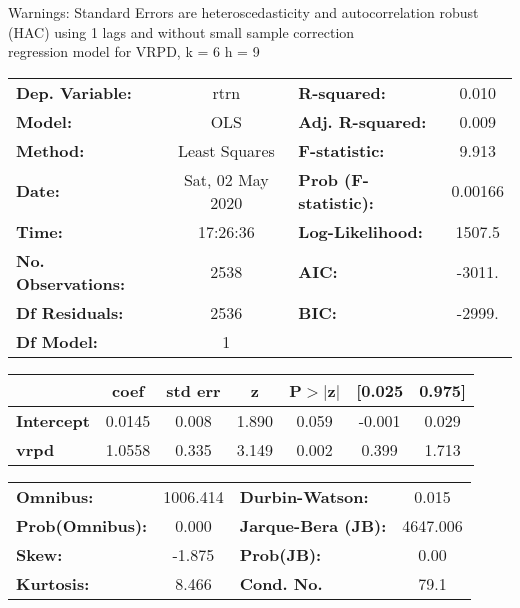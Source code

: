 Warnings: \newline
 [1] Standard Errors are heteroscedasticity and autocorrelation robust (HAC) using 1 lags and without small sample correction\\ 

regression model for VRPD, k = 6 h = 9\begin{center}
\begin{tabular}{lclc}
\toprule
\textbf{Dep. Variable:}    &       rtrn       & \textbf{  R-squared:         } &     0.010   \\
\textbf{Model:}            &       OLS        & \textbf{  Adj. R-squared:    } &     0.009   \\
\textbf{Method:}           &  Least Squares   & \textbf{  F-statistic:       } &     9.913   \\
\textbf{Date:}             & Sat, 02 May 2020 & \textbf{  Prob (F-statistic):} &  0.00166    \\
\textbf{Time:}             &     17:26:36     & \textbf{  Log-Likelihood:    } &    1507.5   \\
\textbf{No. Observations:} &        2538      & \textbf{  AIC:               } &    -3011.   \\
\textbf{Df Residuals:}     &        2536      & \textbf{  BIC:               } &    -2999.   \\
\textbf{Df Model:}         &           1      & \textbf{                     } &             \\
\bottomrule
\end{tabular}
\begin{tabular}{lcccccc}
                   & \textbf{coef} & \textbf{std err} & \textbf{z} & \textbf{P$> |$z$|$} & \textbf{[0.025} & \textbf{0.975]}  \\
\midrule
\textbf{Intercept} &       0.0145  &        0.008     &     1.890  &         0.059        &       -0.001    &        0.029     \\
\textbf{vrpd}      &       1.0558  &        0.335     &     3.149  &         0.002        &        0.399    &        1.713     \\
\bottomrule
\end{tabular}
\begin{tabular}{lclc}
\textbf{Omnibus:}       & 1006.414 & \textbf{  Durbin-Watson:     } &    0.015  \\
\textbf{Prob(Omnibus):} &   0.000  & \textbf{  Jarque-Bera (JB):  } & 4647.006  \\
\textbf{Skew:}          &  -1.875  & \textbf{  Prob(JB):          } &     0.00  \\
\textbf{Kurtosis:}      &   8.466  & \textbf{  Cond. No.          } &     79.1  \\
\bottomrule
\end{tabular}
\end{center}

